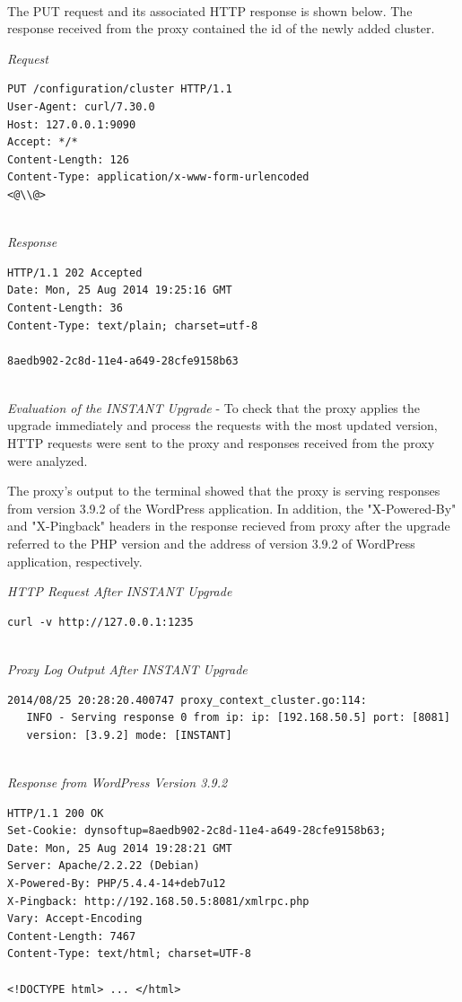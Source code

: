 \documentclass[a4paper,11pt,twoside]{report}
\begin{document}
\noindent\\
The PUT request and its associated HTTP response is shown below. The response received from the proxy contained the id of the newly added cluster.\smallskip 

\noindent
\textit{Request}
\begin{lstlisting}[language=terminal]
PUT /configuration/cluster HTTP/1.1
User-Agent: curl/7.30.0
Host: 127.0.0.1:9090
Accept: */*
Content-Length: 126
Content-Type: application/x-www-form-urlencoded
<@\\@>
\end{lstlisting}

\noindent\\
\textit{Response}
\begin{lstlisting}[language=terminal]
HTTP/1.1 202 Accepted
Date: Mon, 25 Aug 2014 19:25:16 GMT
Content-Length: 36
Content-Type: text/plain; charset=utf-8

8aedb902-2c8d-11e4-a649-28cfe9158b63
\end{lstlisting}  

\noindent\\
\textit{Evaluation of the INSTANT Upgrade} - To check that the proxy applies the upgrade immediately and process the requests with the most updated version, HTTP requests were sent to the proxy and responses received from the proxy were analyzed.

The proxy's output to the terminal showed that the proxy is serving responses from version 3.9.2 of the WordPress application. In addition, the "X-Powered-By" and "X-Pingback" headers in the response recieved from proxy after the upgrade referred to the PHP version and the address of version 3.9.2 of WordPress application, respectively. \smallskip 

\noindent
\textit{HTTP Request After INSTANT Upgrade}
\begin{lstlisting}[language=terminal]
curl -v http://127.0.0.1:1235
\end{lstlisting}

\noindent\\
\textit{Proxy Log Output After INSTANT Upgrade}
\begin{lstlisting}[language=terminal]
2014/08/25 20:28:20.400747 proxy_context_cluster.go:114:     
   INFO - Serving response 0 from ip: ip: [192.168.50.5] port: [8081] 
   version: [3.9.2] mode: [INSTANT]
\end{lstlisting}

\noindent\\
\textit{Response from WordPress Version 3.9.2 }
\begin{lstlisting}[language=terminal]
HTTP/1.1 200 OK
Set-Cookie: dynsoftup=8aedb902-2c8d-11e4-a649-28cfe9158b63;
Date: Mon, 25 Aug 2014 19:28:21 GMT
Server: Apache/2.2.22 (Debian)
X-Powered-By: PHP/5.4.4-14+deb7u12
X-Pingback: http://192.168.50.5:8081/xmlrpc.php
Vary: Accept-Encoding
Content-Length: 7467
Content-Type: text/html; charset=UTF-8

<!DOCTYPE html> ... </html>
\end{lstlisting}
\end{document}
